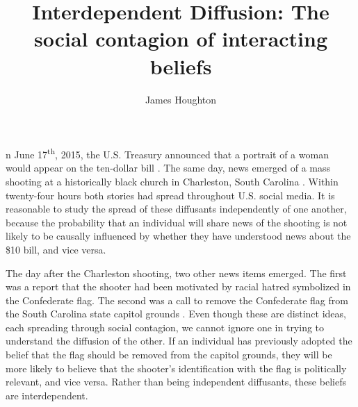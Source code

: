 \documentclass[9pt,twocolumn,twoside,lineno]{pnas-new}
\title{Interdependent Diffusion: The social contagion of interacting beliefs}
\author[a,b]{James Houghton}
\affil[a]{Massachusetts Institute of Technology}
\affil[b]{University of Pennsylvania}
\begin{document}
\maketitle
\thispagestyle{firststyle}

n June 17\textsuperscript{th}, 2015, the U.S. Treasury announced that a portrait of a woman would appear on the ten-dollar bill \cite{calmes_2015}. The same day, news emerged of a mass shooting at a historically black church in Charleston, South Carolina \cite{houghton2019beyond,hawes2019grace}. Within twenty-four hours both stories had spread throughout U.S. social media. It is reasonable to study the spread of these diffusants independently of one another, because the probability that an individual will share news of the shooting is not likely to be causally influenced by whether they have understood news about the \$10 bill, and vice versa.

The day after the Charleston shooting, two other news items emerged. The first was a report that the shooter had been motivated by racial hatred symbolized in the Confederate flag. The second was a call to remove the Confederate flag from the South Carolina state capitol grounds \cite{houghton2019beyond,hawes2019grace}. Even though these are distinct ideas, each spreading through social contagion, we cannot ignore one in trying to understand the diffusion of the other. If an individual has previously adopted the belief that the flag should be removed from the capitol grounds, they will be more likely to believe that the shooter’s identification with the flag is politically relevant, and vice versa. Rather than being independent diffusants, these beliefs are interdependent. 
\end{document}
